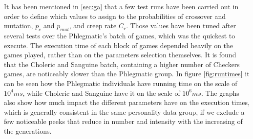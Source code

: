 It has been mentioned in \ref{sec:ga} that a few test runs have been carried out in order to define which values to assign to the probabilities of crossover and mutation, $p_c$ and $p_{mut}$, and creep rate $C_r$. Those values have been tuned after several tests over the Phlegmatic's batch of games, which was the quickest to execute. The execution time of each block of games depended heavily on the games played, rather than on the parameters selection themselves. It is found that the Choleric and Sanguine batch, containing a higher number of Checkers games, are noticeably slower than the Phlegmatic group. In figure \ref{fig:runtimes} it can be seen how the Phlegmatic individuals have running time on the scale of $10^4ms$, while Choleric and Sanguine have it on the scale of $10^6ms$. The graphs also show how much impact the different parameters have on the execution times, which is generally consistent in the same personality data group, if we exclude a few noticeable peeks that reduce in number and intensity with the increasing of the generations. 
